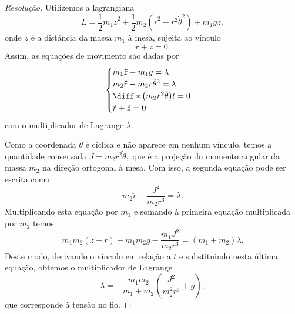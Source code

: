 \begin{proof}[Resolução]
    Utilizemos a lagrangiana
    \begin{equation*}
        L = \frac12m_1\dot{z}^2 + \frac12 m_2\left(\dot{r}^2 + r^2\dot{\theta}^2\right) + m_1gz,
    \end{equation*} onde \(z\) é a distância da massa \(m_1\) à mesa, sujeita ao vínculo
    \begin{equation*}
        \dot{r} + \dot{z} = 0.
    \end{equation*}
    Assim, as equações de movimento são dadas por
    \begin{equation*}
        \begin{cases}
            m_1 \ddot{z} - m_1 g = \lambda\\
            m_2 \ddot{r} - m_2r \dot{\theta}^2 = \lambda\\
            \diff*{\left(m_2 r^2\dot{\theta}\right)}{t} = 0\\
            \dot{r} + \dot{z} = 0
        \end{cases}
    \end{equation*}
    com o multiplicador de Lagrange \(\lambda\).

    Como a coordenada \(\theta\) é cíclica e não aparece em nenhum vínculo, temos a quantidade conservada \(J = m_2r^2\dot\theta,\) que é a projeção do momento angular da massa \(m_2\) na direção ortogonal à mesa. Com isso, a segunda equação pode ser escrita como
    \begin{equation*}
        m_2\ddot{r} - \frac{J^2}{m_2r^3} = \lambda.
    \end{equation*}
    Multiplicando esta equação por \(m_1\) e somando à primeira equação multiplicada por \(m_2\) temos
    \begin{equation*}
        m_1m_2(\ddot{z}+\ddot{r}) - m_1m_2g - \frac{m_1J^2}{m_2r^3} = (m_1 + m_2) \lambda.
    \end{equation*}
    Deste modo, derivando o vínculo em relação a \(t\) e substituindo nesta última equação, obtemos o multiplicador de Lagrange
    \begin{equation*}
        \lambda = - \frac{m_1 m_2}{m_1 + m_2}\left(\frac{J^2}{m_2^2 r^3} + g\right),
    \end{equation*}
    que corresponde à tensão no fio.
\end{proof}

